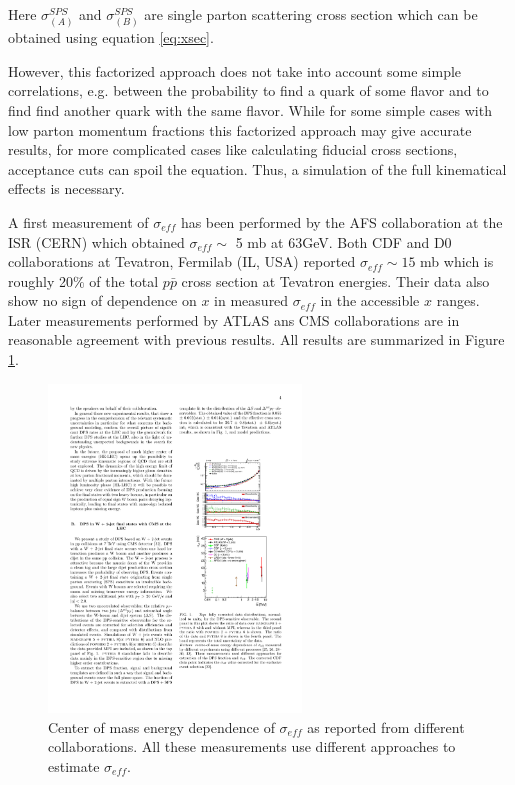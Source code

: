 Here $\sigma^{SPS}_{(A)}$ and $\sigma^{SPS}_{(B)}$ are single parton scattering cross section which can be obtained using equation \ref{eq:xsec}.
\par However, this factorized approach does not take into account some simple correlations, e.g. between the probability to find a quark of some flavor and to find find another quark with the same flavor. While for some simple cases with low parton momentum fractions this factorized approach may give accurate results, for more complicated cases like calculating fiducial cross sections, acceptance cuts can spoil the equation. Thus, a simulation of the full kinematical effects is necessary.
\par A first measurement of $\sigma_{eff}$ has been performed by the AFS collaboration at the ISR (CERN) which obtained $\sigma_{eff} \sim$ 5 mb at 63GeV. Both CDF and D0 collaborations at Tevatron, Fermilab (IL, USA) reported $\sigma_{eff} \sim 15$ mb which is roughly 20$\%$ of the total $p\bar{p}$ cross section at Tevatron energies. Their data also show no sign of dependence on $x$ in measured $\sigma_{eff}$  in the accessible $x$ ranges. Later measurements performed by ATLAS ans CMS collaborations are in reasonable agreement with previous results. All results are summarized in Figure \ref{fig:DPS_res}.
\begin{figure}[htbp]
	\centering
		\includegraphics[width=0.6\textwidth]{Figures/DPS_res.pdf}
	\caption[Results of $\sigma_{eff}$ measurements]{Center of mass energy dependence of $\sigma_{eff}$ as reported from different collaborations. All these measurements use different approaches to estimate $\sigma_{eff}$. \cite{Bansal:2014paa}}
	\label{fig:DPS_res}
\end{figure}
